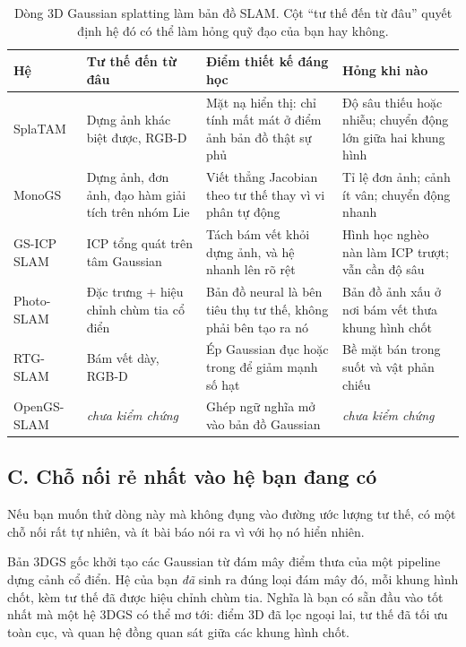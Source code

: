 \documentclass[../../deep_learning.tex]{subfiles}
\begin{document}
\begin{table}[H]\centering\footnotesize
\caption{Dòng 3D Gaussian splatting làm bản đồ SLAM. Cột ``tư thế đến từ đâu'' quyết định hệ đó có thể làm hỏng quỹ đạo của bạn hay không.}
\label{tab:f32-gs-line}
\begin{tabularx}{\linewidth}{@{}L{2.05cm}L{2.6cm}YL{3.5cm}@{}}
\toprule
\textbf{Hệ} & \textbf{Tư thế đến từ đâu} & \textbf{Điểm thiết kế đáng học} & \textbf{Hỏng khi nào}\\
\midrule
SplaTAM & Dựng ảnh khác biệt được, RGB-D & Mặt nạ hiển thị: chỉ tính mất mát ở điểm ảnh bản đồ thật sự phủ & Độ sâu thiếu hoặc nhiễu; chuyển động lớn giữa hai khung hình\\
MonoGS & Dựng ảnh, đơn ảnh, đạo hàm giải tích trên nhóm Lie & Viết thẳng Jacobian theo tư thế thay vì vi phân tự động & Tỉ lệ đơn ảnh; cảnh ít vân; chuyển động nhanh\\
GS-ICP SLAM & ICP tổng quát trên tâm Gaussian & Tách bám vết khỏi dựng ảnh, và hệ nhanh lên rõ rệt & Hình học nghèo nàn làm ICP trượt; vẫn cần độ sâu\\
Photo-SLAM & Đặc trưng \(+\) hiệu chỉnh chùm tia cổ điển & Bản đồ neural là bên tiêu thụ tư thế, không phải bên tạo ra nó & Bản đồ ảnh xấu ở nơi bám vết thưa khung hình chốt\\
RTG-SLAM & Bám vết dày, RGB-D & Ép Gaussian đục hoặc trong để giảm mạnh số hạt & Bề mặt bán trong suốt và vật phản chiếu\\
OpenGS-SLAM & \emph{chưa kiểm chứng} & Ghép ngữ nghĩa mở vào bản đồ Gaussian & \emph{chưa kiểm chứng}\\
\bottomrule
\end{tabularx}
\end{table}

\subsection{C. Chỗ nối rẻ nhất vào hệ bạn đang có}
Nếu bạn muốn thử dòng này mà không đụng vào đường ước lượng tư thế, có một chỗ nối rất tự nhiên, và ít bài báo nói ra vì với họ nó hiển nhiên.

Bản 3DGS gốc khởi tạo các Gaussian từ đám mây điểm thưa của một pipeline dựng cảnh cổ điển. Hệ của bạn \emph{đã} sinh ra đúng loại đám mây đó, mỗi khung hình chốt, kèm tư thế đã được hiệu chỉnh chùm tia. Nghĩa là bạn có sẵn đầu vào tốt nhất mà một hệ 3DGS có thể mơ tới: điểm 3D đã lọc ngoại lai, tư thế đã tối ưu toàn cục, và quan hệ đồng quan sát giữa các khung hình chốt.
\end{document}
